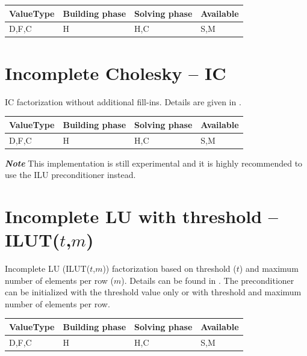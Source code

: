 \begin{table}[H]
\begin{tabular}{l|l|l|l}
\multicolumn{1}{c|}{ValueType} & Building phase & Solving phase & Available \\ \hline
D,F,C                          & H              & H,C           & S,M      
\end{tabular}
\end{table}





\section{Incomplete Cholesky -- IC}


IC factorization without additional fill-ins. Details are given in \cite{SAAD}.

\begin{table}[H]
\begin{tabular}{l|l|l|l}
\multicolumn{1}{c|}{ValueType} & Building phase & Solving phase & Available \\ \hline
D,F,C                          & H              & H,C           & S,M      
\end{tabular}
\end{table}



\textbf{\emph{Note}} This implementation is still experimental and it is highly recommended to use the ILU
preconditioner instead.

\section{Incomplete LU with threshold -- ILUT($t$,$m$)}


Incomplete LU (ILUT($t$,$m$)) factorization based on threshold ($t$) and maximum number of elements per row ($m$). Details can be found in \cite{SAAD}. The preconditioner can be initialized with the threshold value only or with threshold and maximum number of elements per row. 

\begin{table}[H]
\begin{tabular}{l|l|l|l}
\multicolumn{1}{c|}{ValueType} & Building phase & Solving phase & Available \\ \hline
D,F,C                          & H              & H,C           & S,M      
\end{tabular}
\end{table}


